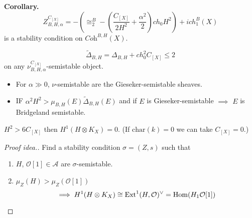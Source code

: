 \medskip\noindent
{\bf Corollary.}
$$
Z_{B,H,\alpha}^{C_{[X]}}=-\left(\cong_2^B-
\left(\frac{C_{[X]}}{2H^2}+\frac{\alpha^2}{2}\right)ch_0H^2\right)
+ich_1^B(X)
$$
is a stability condition on $\textit{Coh}^{B,H}(X)$.

\begin{remark}
\label{remark-inequality}
$$
\tilde{\Delta}_{B,H}=\Delta_{B,H}+ch_0^2C_{[X]}\leq 2
$$
on any $\nu_{B,H,\alpha}^{C_{[X]}}$-semistable object.
\end{remark}

\begin{lemma}
\label{lemma-low-key-lemma}
\begin{itemize}
\item For $\alpha\gg 0$, $\nu$-semistable are the Gieseker-semistable sheaves.
\item IF $\alpha^2H^2>\mu_{B,H}(E)\tilde{\Delta}_{B,H}(E)$ and if $E$ is
Gieseker-semistable $\implies$ $E$ is Bridgeland semistable.
\end{itemize}
\end{lemma}

\begin{theorem}
\label{theorem-vanishing}
$H^2>6 C_{[X]}$ then $H^1(H \otimes K_X)=0$. (If $\text{char}(k)=0$ we can take
$C_{[X]}=0$.)
\end{theorem}

\begin{proof}[Proof idea.]
Find a stability condition $\sigma=(Z,s)$ such that
\begin{enumerate}
\item $H$,  $\mathcal{O}[1] \in \mathcal{A}$ are $\sigma$-semistable.
\item $\mu_Z(H)>\mu_Z(\mathcal{O}[1])$ 
$$
\implies H^{1}(H \otimes K_X) \cong \text{Ext}^1(H,\mathcal{O})^\vee
= \mathop{\mathrm{Hom}}\nolimits(H_1\mathcal{O}[1])
$$
\end{enumerate}
\end{proof}

